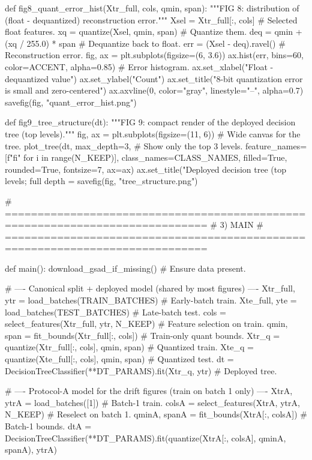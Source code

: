 def fig8_quant_error_hist(Xtr_full, cols, qmin, span):
    """FIG 8: distribution of (float - dequantized) reconstruction error."""
    Xsel = Xtr_full[:, cols]                          # Selected float features.
    xq = quantize(Xsel, qmin, span)                  # Quantize them.
    deq = qmin + (xq / 255.0) * span                 # Dequantize back to float.
    err = (Xsel - deq).ravel()                       # Reconstruction error.
    fig, ax = plt.subplots(figsize=(6, 3.6))
    ax.hist(err, bins=60, color=ACCENT, alpha=0.85)  # Error histogram.
    ax.set_xlabel("Float - dequantized value")
    ax.set_ylabel("Count")
    ax.set_title("8-bit quantization error is small and zero-centered")
    ax.axvline(0, color="gray", linestyle="--", alpha=0.7)
    savefig(fig, "quant_error_hist.png")

def fig9_tree_structure(dt):
    """FIG 9: compact render of the deployed decision tree (top levels)."""
    fig, ax = plt.subplots(figsize=(11, 6))          # Wide canvas for the tree.
    plot_tree(dt, max_depth=3,                       # Show only the top 3 levels.
              feature_names=[f"f{i}" for i in range(N_KEEP)],
              class_names=CLASS_NAMES, filled=True, rounded=True,
              fontsize=7, ax=ax)
    ax.set_title("Deployed decision tree (top levels; full depth = %
    savefig(fig, "tree_structure.png")

# =============================================================================
# 3) MAIN
# =============================================================================

def main():
    download_gsad_if_missing()                       # Ensure data present.

    # ---- Canonical split + deployed model (shared by most figures) ----
    Xtr_full, ytr = load_batches(TRAIN_BATCHES)      # Early-batch train.
    Xte_full, yte = load_batches(TEST_BATCHES)       # Late-batch test.
    cols = select_features(Xtr_full, ytr, N_KEEP)    # Feature selection on train.
    qmin, span = fit_bounds(Xtr_full[:, cols])       # Train-only quant bounds.
    Xtr_q = quantize(Xtr_full[:, cols], qmin, span)  # Quantized train.
    Xte_q = quantize(Xte_full[:, cols], qmin, span)  # Quantized test.
    dt = DecisionTreeClassifier(**DT_PARAMS).fit(Xtr_q, ytr)  # Deployed tree.

    # ---- Protocol-A model for the drift figures (train on batch 1 only) ----
    XtrA, ytrA = load_batches([1])                   # Batch-1 train.
    colsA = select_features(XtrA, ytrA, N_KEEP)      # Reselect on batch 1.
    qminA, spanA = fit_bounds(XtrA[:, colsA])        # Batch-1 bounds.
    dtA = DecisionTreeClassifier(**DT_PARAMS).fit(quantize(XtrA[:, colsA], qminA, spanA), ytrA)

